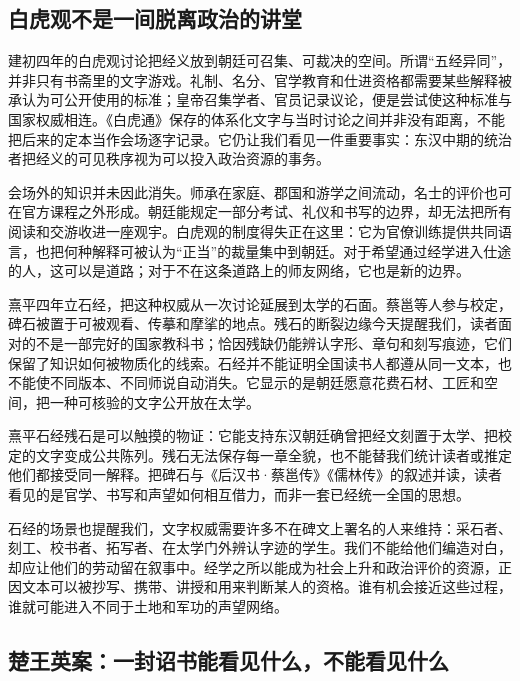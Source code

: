 \subsection{白虎观不是一间脱离政治的讲堂}

建初四年的白虎观讨论把经义放到朝廷可召集、可裁决的空间。所谓“五经异同”，并非只有书斋里的文字游戏。礼制、名分、官学教育和仕进资格都需要某些解释被承认为可公开使用的标准；皇帝召集学者、官员记录议论，便是尝试使这种标准与国家权威相连。《白虎通》保存的体系化文字与当时讨论之间并非没有距离，不能把后来的定本当作会场逐字记录。它仍让我们看见一件重要事实：东汉中期的统治者把经义的可见秩序视为可以投入政治资源的事务。

会场外的知识并未因此消失。师承在家庭、郡国和游学之间流动，名士的评价也可在官方课程之外形成。朝廷能规定一部分考试、礼仪和书写的边界，却无法把所有阅读和交游收进一座观宇。白虎观的制度得失正在这里：它为官僚训练提供共同语言，也把何种解释可被认为“正当”的裁量集中到朝廷。对于希望通过经学进入仕途的人，这可以是道路；对于不在这条道路上的师友网络，它也是新的边界。

熹平四年立石经，把这种权威从一次讨论延展到太学的石面。蔡邕等人参与校定，碑石被置于可被观看、传摹和摩挲的地点。残石的断裂边缘今天提醒我们，读者面对的不是一部完好的国家教科书；恰因残缺仍能辨认字形、章句和刻写痕迹，它们保留了知识如何被物质化的线索。石经并不能证明全国读书人都遵从同一文本，也不能使不同版本、不同师说自动消失。它显示的是朝廷愿意花费石材、工匠和空间，把一种可核验的文字公开放在太学。

\begin{textwindow}[石经的石面怎样改变读法]
熹平石经残石是可以触摸的物证：它能支持东汉朝廷确曾把经文刻置于太学、把校定的文字变成公共陈列。残石无法保存每一章全貌，也不能替我们统计读者或推定他们都接受同一解释。把碑石与《后汉书·蔡邕传》《儒林传》的叙述并读，读者看见的是官学、书写和声望如何相互借力，而非一套已经统一全国的思想。
\end{textwindow}

石经的场景也提醒我们，文字权威需要许多不在碑文上署名的人来维持：采石者、刻工、校书者、拓写者、在太学门外辨认字迹的学生。我们不能给他们编造对白，却应让他们的劳动留在叙事中。经学之所以能成为社会上升和政治评价的资源，正因文本可以被抄写、携带、讲授和用来判断某人的资格。谁有机会接近这些过程，谁就可能进入不同于土地和军功的声望网络。

\subsection{楚王英案：一封诏书能看见什么，不能看见什么}

